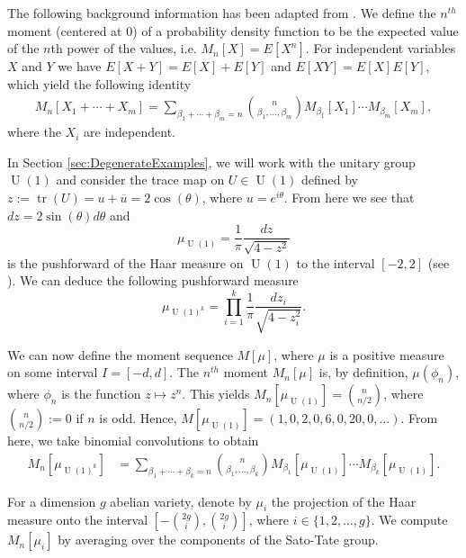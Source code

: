 \documentclass[reqno, oneside, 12pt]{amsart}
\DeclareMathOperator{\U}{U}
\DeclareMathOperator{\tr}{tr}
\theoremstyle{remark}
\numberwithin{equation}{section}
\begin{document}
The following background information has been adapted from \cite{EmoryGoodson2020, GoodsonCatalan}. We define the $n^{th}$ moment (centered at 0) of a probability density function to be the expected value of the $n$th power of the values, i.e. $M_n[X]=E[X^n]$. For independent variables $X$ and $Y$ we have $E[X+Y]=E[X]+E[Y]$ and $E[XY]=E[X]E[Y]$, which yield the following identity
\begin{align*}
     M_n[X_1+\cdots + X_m]=\sum_{\beta_1+\cdots+\beta_m=n} \binom{n}{\beta_1,\ldots, \beta_m}M_{\beta_1}[X_1]\cdots M_{\beta_m}[X_m],
\end{align*}
where the $X_i$ are independent.

In Section \ref{sec:DegenerateExamples}, we will work with the unitary group $\U(1)$ and consider the trace map  on $U\in \U(1)$ defined by $z:=\tr(U)=u+\overline{u}=2\cos(\theta)$, where $u=e^{i\theta}$.  From here we see that $dz=2\sin(\theta)d\theta$ and 
$$\mu_{\U(1)}= \frac1\pi \frac{dz}{\sqrt{4-z^2}}$$
is the pushforward of the Haar measure on  $\U(1)$ to the interval $[-2,2]$
(see \cite[Section 2]{SutherlandNotes}). We can deduce the following pushforward measure
\begin{equation*}\label{eqn:muU1}
    \mu_{\U(1)^k}= \prod_{i=1}^k \frac1\pi \frac{dz_i}{\sqrt{4-z_i^2}}.
\end{equation*} 

We can now define the moment sequence $M[\mu]$, where $\mu$ is a positive measure on some interval $I=[-d,d]$. The $n^{th}$ moment $M_n[\mu]$  is, by definition,   $\mu(\phi_n)$, where $\phi_n$ is the function $z\mapsto z^n$. This yields $M_n[\mu_{\U(1)}]  = \binom{n}{n/2}$, where $\binom{n}{n/2}:=0$ if $n$ is odd. Hence, $M[\mu_{\U(1)}] = (1,0,2, 0,6,0,20,0,\ldots).$ From here, we  take binomial convolutions to obtain
\begin{align*}
    M_n[\mu_{\U(1)^k}] &=\sum_{\beta_1+\cdots+\beta_k=n} \binom{n}{\beta_1,\ldots, \beta_k}M_{\beta_1}[\mu_{\U(1)}]\cdots M_{\beta_k}[\mu_{\U(1)}].%
\end{align*}

For a dimension $g$ abelian variety, denote by $\mu_i$ the projection of the Haar measure onto the interval $\left[-\binom{2g}{i},\binom{2g}{i}\right]$, where $i\in\{1,2, \ldots, g\}$. We  compute $M_n[\mu_i]$ by averaging over the components of the Sato-Tate group.

\end{document}
